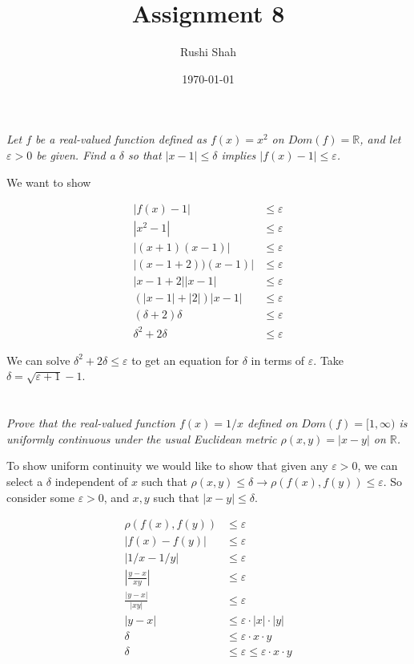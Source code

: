 \documentclass[]{article}
\author{Rushi Shah}
\date{\today}
\title{Assignment 8}
\newcommand{\reals}{\mathbb{R}}
\begin{document}
	\maketitle

	\section{}
		\textit{Let $f$ be a real-valued function defined as $f(x) = x^2$ on $Dom(f) = \reals$, and let $\varepsilon > 0$ be given. Find a $\delta$ so that $|x - 1| \leq \delta$ implies $|f(x) - 1| \leq \varepsilon$.}

		We want to show

		\begin{align*}
			|f(x) - 1| &\leq \varepsilon \\
			|x^2 - 1| &\leq \varepsilon \\
			|(x + 1)(x - 1)| &\leq \varepsilon \\ 
			|(x - 1 + 2))(x - 1)| &\leq \varepsilon \\
			|x - 1 + 2||x - 1| &\leq \varepsilon \\
			(|x - 1| + |2|)|x - 1| &\leq \varepsilon \\
			(\delta + 2)\delta &\leq \varepsilon \\
			\delta^2 + 2 \delta &\leq \varepsilon
		\end{align*}

		We can solve $\delta^2 + 2 \delta \leq \varepsilon$ to get an equation for $\delta$ in terms of $\varepsilon$. Take $\delta = \sqrt{\varepsilon + 1} - 1$.

	\section{}
		\textit{Prove that the real-valued function $f(x) = 1/x$ defined on $Dom(f) = [1, \infty)$ is uniformly continuous under the usual Euclidean metric $\rho(x, y) = |x - y|$ on $\reals$.}

		To show uniform continuity we would like to show that given any $\varepsilon > 0$, we can select a $\delta$ independent of $x$ such that $\rho(x, y) \leq \delta \to \rho(f(x), f(y)) \leq \varepsilon$. So consider some $\varepsilon > 0$, and $x, y$ such that $|x - y| \leq \delta$. 

		\begin{align*}
			\rho(f(x), f(y)) &\leq \varepsilon \\
			|f(x) - f(y)| &\leq \varepsilon	\\
			|1/x - 1/y| &\leq \varepsilon \\
			|\frac{y - x}{xy}| &\leq \varepsilon \\
			\frac{|y - x|}{|xy|} &\leq \varepsilon \\
			|y - x| &\leq \varepsilon \cdot |x| \cdot |y| \\
			\delta &\leq \varepsilon \cdot x \cdot y \\
			\delta &\leq \varepsilon \leq \varepsilon \cdot x \cdot y
		\end{align*}
\end{document}
